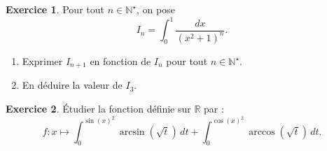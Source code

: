 \documentclass[a4paper, 11pt,openany]{article}%
\theoremstyle{plain}
\theoremstyle{definition}
\newtheorem{exo}{Exercice}
\newtheorem{sol}{Solution de l'exercice}
\theoremstyle{remark}
\newcommand{\R}{\mathbb{R}}
\newcommand{\N}{\mathbb{N}}
\begin{document}
\begin{exo}
Pour tout $n \in \N^{\star}$, on pose \[ I_n= \int_0^1 \frac{dx}{(x^2+1)^n}.\]
\begin{enumerate}
\item Exprimer $I_{n+1}$ en fonction de $I_n$ pour tout $n \in \N^{\star}$.
\item En déduire la valeur de $I_3$.
\end{enumerate}
\end{exo}





\begin{exo}
Étudier la fonction définie sur $\R$ par : \[ f:x \mapsto \int_{0}^{\sin(x)^2}  \arcsin(\sqrt{t}) \, dt +\int_{0}^{\cos(x)^2}  \arccos(\sqrt{t}) \, dt.\]
\end{exo}
\end{document}
